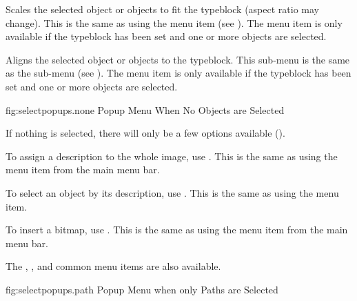 Scales the selected object or objects to fit the \gls{typeblock}
(aspect ratio may change). This is the same as using the
 menu item (see ).
The  menu item is only
available if the \gls{typeblock} has been set and one or more
objects are selected.

Aligns the selected object or objects to the \gls{typeblock}.
This sub-menu is the same as the
 sub-menu
(see ).
The  menu item is only
available if the \gls{typeblock} has been set and one or more
objects are selected.



\FloatFig
  {fig:selectpopups.none}
  {}
  {Popup Menu When No Objects are Selected}

If nothing is selected, there will only be a few options available
().


To assign a description to the whole image, use
. This is the same as using the
 menu item from the main menu bar.


To select an \gls{object} by its description, use
. This is the same as using the
 menu item.


To insert a \gls{bitmap}, use . This
is the same as using the  menu item from the main menu bar.

The , ,
 and
 common menu items are also available.



\FloatFig
  {fig:selectpopups.path}
  {}
  {Popup Menu when only Paths are Selected}

